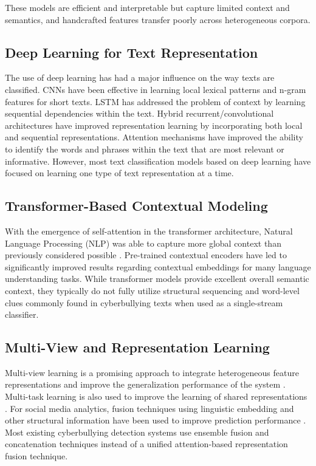 These models are efficient and interpretable but capture limited context and semantics, and handcrafted features transfer poorly across heterogeneous corpora.

\subsection{Deep Learning for Text Representation}

The use of deep learning has had a major influence on the way texts are classified. CNNs have been effective in learning local lexical patterns and n-gram features for short texts. LSTM has addressed the problem of context by learning sequential dependencies within the text. Hybrid recurrent/convolutional architectures have improved representation learning by incorporating both local and sequential representations. Attention mechanisms have improved the ability to identify the words and phrases within the text that are most relevant or informative. However, most text classification models based on deep learning have focused on learning one type of text representation at a time.

\subsection{Transformer-Based Contextual Modeling}

With the emergence of self-attention in the transformer architecture, Natural Language Processing (NLP) was able to capture more global context than previously considered possible \cite{ref9}. Pre-trained contextual encoders have led to significantly improved results regarding contextual embeddings for many language understanding tasks. While transformer models provide excellent overall semantic context, they typically do not fully utilize structural sequencing and word-level clues commonly found in cyberbullying texts when used as a single-stream classifier.

\subsection{Multi-View and Representation Learning}

Multi-view learning is a promising approach to integrate heterogeneous feature representations and improve the generalization performance of the system \cite{ref19}. Multi-task learning is also used to improve the learning of shared representations \cite{ref20}. For social media analytics, fusion techniques using linguistic embedding and other structural information have been used to improve prediction performance \cite{ref21, ref22}. Most existing cyberbullying detection systems use ensemble fusion and concatenation techniques instead of a unified attention-based representation fusion technique.

